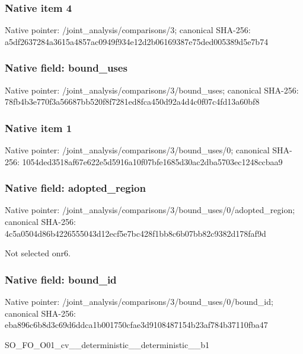 \documentclass[10pt,a4paper]{article}
\begin{document}
\subsubsection{Native item 4}
Native pointer: /joint\_\allowbreak{}analysis/comparisons/3; canonical SHA-256: a5df2637284a3615a4857ac0949f934e12d2b06169387e75ded005389d5e7b74

\subsubsection{Native field: bound\_\allowbreak{}uses}
Native pointer: /joint\_\allowbreak{}analysis/comparisons/3/bound\_\allowbreak{}uses; canonical SHA-256: 78fb4b3e770f3a56687bb520f8f7281ed8fca450d92a4d4c0f07c4fd13a60bf8

\subsubsection{Native item 1}
Native pointer: /joint\_\allowbreak{}analysis/comparisons/3/bound\_\allowbreak{}uses/0; canonical SHA-256: 1054ded3518af67e622e5d5916a10f07bfe1685d30ac2dba5703ec1248ccbaa9

\subsubsection{Native field: adopted\_\allowbreak{}region}
Native pointer: /joint\_\allowbreak{}analysis/comparisons/3/bound\_\allowbreak{}uses/0/adopted\_\allowbreak{}region; canonical SHA-256: 4c5a0504d86b4226555043d12ecf5e7bc428f1bb8c6b07bb82c9382d178faf9d

\begingroup\raggedright\sloppy Not selected onr6.\par\endgroup

\subsubsection{Native field: bound\_\allowbreak{}id}
Native pointer: /joint\_\allowbreak{}analysis/comparisons/3/bound\_\allowbreak{}uses/0/bound\_\allowbreak{}id; canonical SHA-256: eba896c6b8d3c69d6ddca1b001750cfae3d9108487154b23af784b37110fba47

\begingroup\raggedright\sloppy SO\_\allowbreak{}FO\_\allowbreak{}O01\_\allowbreak{}cv\_\allowbreak{}\_\allowbreak{}deterministic\_\allowbreak{}\_\allowbreak{}deterministic\_\allowbreak{}\_\allowbreak{}b1\par\endgroup
\end{document}
